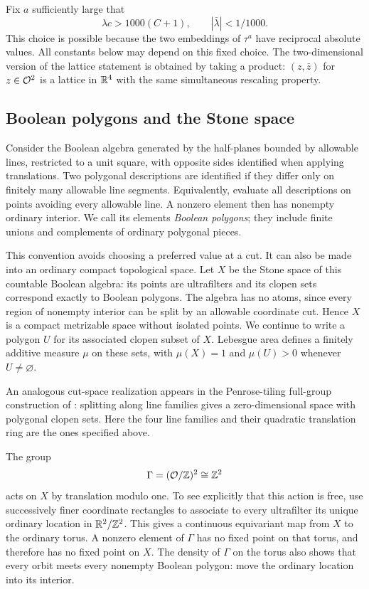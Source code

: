 Fix $a$ sufficiently large that
\begin{equation}\label{eq:lambda-choice}
 \lambda c>1000(C+1),\qquad |\bar\lambda|<1/1000.
\end{equation}
This choice is possible because the two embeddings of $\tau^a$ have
reciprocal absolute values. All constants below may depend on this
fixed choice. The two-dimensional version of the lattice statement
is obtained by taking a product: $(z,\bar z)$ for $z\in\mathcal O^2$ is a
lattice in $\mathbb R^4$ with the same simultaneous rescaling property.

\subsection{Boolean polygons and the Stone space}

Consider the Boolean algebra generated by the half-planes bounded by
allowable lines, restricted to a unit square, with opposite sides
identified when applying translations. Two polygonal descriptions are
identified if they differ only on finitely many allowable line
segments. Equivalently, evaluate all descriptions on points avoiding
every allowable line. A nonzero element then has nonempty ordinary
interior. We call its elements \emph{Boolean polygons}; they include
finite unions and complements of ordinary polygonal pieces.

This convention avoids choosing a preferred value at a cut. It can
also be made into an ordinary compact topological space. Let $X$ be
the Stone space of this countable Boolean algebra: its points are
ultrafilters and its clopen sets correspond exactly to Boolean
polygons. The algebra has no atoms, since every region of nonempty
interior can be split by an allowable coordinate cut. Hence $X$ is a
compact metrizable space without isolated points. We continue to
write a polygon $U$ for its associated clopen subset of $X$.
Lebesgue area defines a finitely additive measure $\mu$ on these
sets, with $\mu(X)=1$ and $\mu(U)>0$ whenever $U\ne\varnothing$.

An analogous cut-space realization appears in the Penrose-tiling
full-group construction of
\cite[Section~4 in the author version]{ChornyiJuschenkoNekrashevych2020}:
splitting along line families gives a zero-dimensional space with polygonal
clopen sets.  Here the four line families and their quadratic translation
ring are the ones specified above.

The group
\[
 \Gamma=(\mathcal O/\mathbb Z)^2\cong\mathbb Z^2
\]
acts on $X$ by translation modulo one. To see explicitly that this
action is free, use successively finer coordinate rectangles to
associate to every ultrafilter its unique ordinary location in
$\mathbb R^2/\mathbb Z^2$. This gives a continuous equivariant map from $X$ to
the ordinary torus. A nonzero element of $\Gamma$ has no fixed point
on that torus, and therefore has no fixed point on $X$. The density
of $\Gamma$ on the torus also shows that every orbit meets every
nonempty Boolean polygon: move the ordinary location into its
interior.

